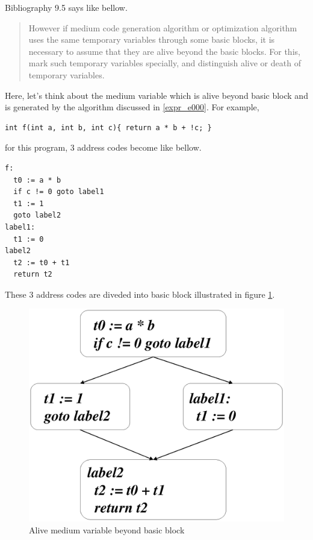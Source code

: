 \label{optimize_e004}
Bibliography \cite{doragon} 9.5 says like bellow.
\begin{quote}
However if medium code generation algorithm or optimization algorithm
uses the same temporary variables through some basic blocks,
it is necessary to assume that they are alive beyond the basic blocks.
For this, mark such temporary variables specially, and distinguish
alive or death of temporary variables.
\end{quote}
Here, let's think about the medium variable which is alive beyond
basic block and is generated by the algorithm discussed in \ref{expr_e000}.
For example,
\begin{verbatim}
int f(int a, int b, int c){ return a * b + !c; }
\end{verbatim}
for this program, 3 address codes become like bellow.
\begin{verbatim}
f:
  t0 := a * b
  if c != 0 goto label1
  t1 := 1
  goto label2
label1:
  t1 := 0
label2
  t2 := t0 + t1
  return t2
\end{verbatim}
These 3 address codes are diveded into basic block illustrated in
figure \ref{optimize_e001}.
\begin{figure}[htbp]
\begin{center}
\includegraphics[width=0.89\linewidth,height=1.0\linewidth]{beyond_medium.eps}
\caption{Alive medium variable beyond basic block}
\label{optimize_e001}
\end{center}
\end{figure}
